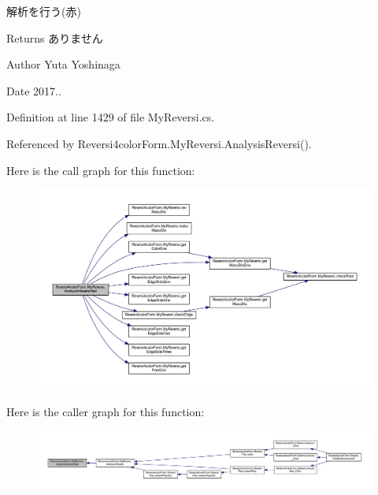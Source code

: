 解析を行う(赤) 

\begin{DoxyReturn}{Returns}
ありません 
\end{DoxyReturn}
\begin{DoxyAuthor}{Author}
Yuta Yoshinaga 
\end{DoxyAuthor}
\begin{DoxyDate}{Date}
2017.. 
\end{DoxyDate}


Definition at line 1429 of file My\+Reversi.\+cs.



Referenced by Reversi4color\+Form.\+My\+Reversi.\+Analysis\+Reversi().

Here is the call graph for this function\+:
\nopagebreak
\begin{figure}[H]
\begin{center}
\leavevmode
\includegraphics[width=350pt]{class_reversi4color_form_1_1_my_reversi_a2d0c12ed7036def583e06ca4df37f367_cgraph}
\end{center}
\end{figure}
Here is the caller graph for this function\+:
\nopagebreak
\begin{figure}[H]
\begin{center}
\leavevmode
\includegraphics[width=350pt]{class_reversi4color_form_1_1_my_reversi_a2d0c12ed7036def583e06ca4df37f367_icgraph}
\end{center}
\end{figure}
\mbox{\label{class_reversi4color_form_1_1_my_reversi_a61ca891ff78c7357ab077ce7bd3cbf97}} 
